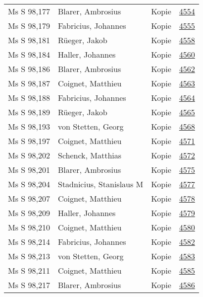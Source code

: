 \documentclass[10pt,a4paper,landscape]{report}
\begin{document}
\begin{longtable}{p{16cm}p{4cm}lr}
Ms S 98,177	&	Blarer, Ambrosius	&	Kopie	&	\href{http://130.60.24.72/assignment/4554}{4554}\\
Ms S 98,179	&	Fabricius, Johannes	&	Kopie	&	\href{http://130.60.24.72/assignment/4555}{4555}\\
Ms S 98,181	&	Rüeger, Jakob	&	Kopie	&	\href{http://130.60.24.72/assignment/4558}{4558}\\
Ms S 98,184	&	Haller, Johannes	&	Kopie	&	\href{http://130.60.24.72/assignment/4560}{4560}\\
Ms S 98,186	&	Blarer, Ambrosius	&	Kopie	&	\href{http://130.60.24.72/assignment/4562}{4562}\\
Ms S 98,187	&	Coignet, Matthieu	&	Kopie	&	\href{http://130.60.24.72/assignment/4563}{4563}\\
Ms S 98,188	&	Fabricius, Johannes	&	Kopie	&	\href{http://130.60.24.72/assignment/4564}{4564}\\
Ms S 98,189	&	Rüeger, Jakob	&	Kopie	&	\href{http://130.60.24.72/assignment/4565}{4565}\\
Ms S 98,193	&	von Stetten, Georg	&	Kopie	&	\href{http://130.60.24.72/assignment/4568}{4568}\\
Ms S 98,197	&	Coignet, Matthieu	&	Kopie	&	\href{http://130.60.24.72/assignment/4571}{4571}\\
Ms S 98,202	&	Schenck, Matthias	&	Kopie	&	\href{http://130.60.24.72/assignment/4572}{4572}\\
Ms S 98,201	&	Blarer, Ambrosius	&	Kopie	&	\href{http://130.60.24.72/assignment/4575}{4575}\\
Ms S 98,204	&	Stadnicius, Stanislaus M	&	Kopie	&	\href{http://130.60.24.72/assignment/4577}{4577}\\
Ms S 98,207	&	Coignet, Matthieu	&	Kopie	&	\href{http://130.60.24.72/assignment/4578}{4578}\\
Ms S 98,209	&	Haller, Johannes	&	Kopie	&	\href{http://130.60.24.72/assignment/4579}{4579}\\
Ms S 98,210	&	Coignet, Matthieu	&	Kopie	&	\href{http://130.60.24.72/assignment/4580}{4580}\\
Ms S 98,214	&	Fabricius, Johannes	&	Kopie	&	\href{http://130.60.24.72/assignment/4582}{4582}\\
Ms S 98,213	&	von Stetten, Georg	&	Kopie	&	\href{http://130.60.24.72/assignment/4583}{4583}\\
Ms S 98,211	&	Coignet, Matthieu	&	Kopie	&	\href{http://130.60.24.72/assignment/4585}{4585}\\
Ms S 98,217	&	Blarer, Ambrosius	&	Kopie	&	\href{http://130.60.24.72/assignment/4586}{4586}\\

\end{longtable}
\end{document}
